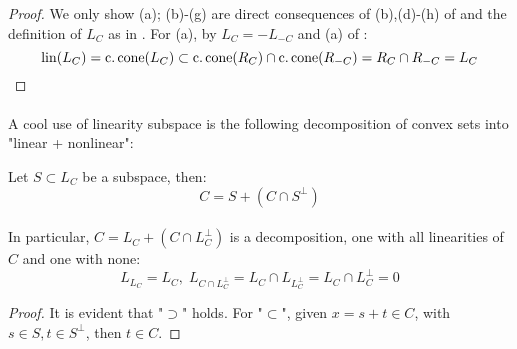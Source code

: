 \begin{proof}
	We only show (a); (b)-(g) are direct consequences of (b),(d)-(h) of  and the definition of $L_C$ as in . For (a), by $L_C=-L_{-C}$ and (a) of :
	\[
		\operatorname{lin}(L_C)=\operatorname{c.cone}(L_C)\subset\operatorname{c.cone}(R_C)\cap \operatorname{c.cone}(R_{-C})=R_C\cap R_{-C}=L_C\qedhere{}
	\]
\end{proof}

\paragraph{}A cool use of linearity subspace is the following decomposition of convex sets into "linear + nonlinear":

\begin{prop}
	\label{prop:013-decomposition}
	Let $S\subset L_C$ be a subspace, then:
	\[C=S+(C\cap S^{\perp})\]
\end{prop}

\paragraph{}In particular, $C=L_C+(C\cap L_C^\perp)$ is a decomposition, one with all linearities of $C$ and one with none:
\[
	L_{L_C}=L_C,\; L_{C\cap L_C^\perp}=L_C\cap L_{L_C^\perp}=L_C\cap L_C^\perp=0
\]

\begin{proof}
	It is evident that "$\supset$" holds. For "$\subset$", given $x=s+t\in C$, with $s\in S,t\in S^\perp$, then $t\in C$.
\end{proof}

